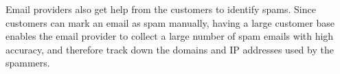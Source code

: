 Email providers also get help from the customers to identify spams. Since
customers can mark an email as spam manually, having a large customer base
enables the email provider to collect a large number of spam emails with high
accuracy, and therefore track down the domains and IP addresses used by the 
spammers.